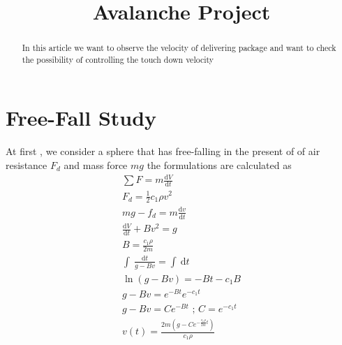 \documentclass[20pt,a4paper]{article}
\title{Avalanche Project}
\begin{document}
    \maketitle

    \begin{abstract}
            In this article we want to observe the velocity of delivering package and want to check the possibility of controlling the touch down velocity
    \end{abstract}

    \section{Free-Fall Study}
    At first , we consider a sphere that has free-falling in the present of of air resistance $F_d$ and mass force $mg$
    the formulations are calculated as 
    \begin{align}
        \sum F= m\frac{\mathrm{d} V}{\mathrm{d} t} \\
         F_d = \frac{1}{2}c_1\rho v^2\\ 
         mg - f_d = m\frac{\mathrm{d} v}{\mathrm{d} t}\\
         \frac{\mathrm{d} V}{\mathrm{d} t}+Bv^2=g\\
         B=\frac{c_1\rho}{2m} \\
         \int_{}^{}  \,\frac{\mathrm{d}t}{g-Bv} =\int_{}^{}  \,\mathrm{d}t\\
         \ln(g-Bv)=-Bt-c_1B \\ g-Bv=e^{-Bt} e^{-c_1t}\\g-Bv=Ce^{-Bt} \text{ ; } C=e^{-c_1t}\\ 
         v(t)=\frac{2m(g-Ce^{-\frac{c_1\rho}{2m}t })}{c_1\rho} 
    \end{align}
\end{document}
